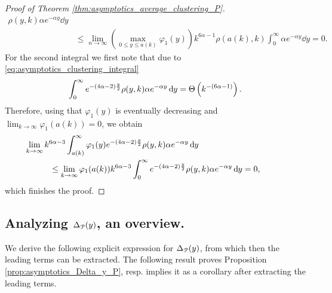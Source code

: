 \begin{proof}[Proof of Theorem \ref{thm:asymptotics_average_clustering_P}]
\begin{align*}
    	\rho(y,k) \alpha e^{-\alpha y} \dd y\\
	&\le \lim_{n \to \infty} \left(\max_{0 \le y \le a(k)} \varphi_1(y)\right) k^{6\alpha - 1} 
    	\rho(a(k), k) \int_0^\infty \alpha e^{-\alpha y} \dd y = 0.
\end{align*}
For the second integral we first note that due to \eqref{eq:asymptotics_clustering_integral}
\[
	\int_0^\infty e^{-(4\alpha - 2)\frac{y}{2}} \rho(y,k) \alpha e^{-\alpha y} \operatorname{\mathrm{d}\hspace{-2pt}} y = \Theta\left(k^{-(6\alpha - 1)}\right).
\] 
Therefore, using that $\varphi_1(y)$ is eventually decreasing and $\lim_{k \to \infty} \varphi_1(a(k)) = 0$, we obtain
\begin{align*}
	&\hspace{-30pt}\lim_{k \to \infty} k^{6\alpha - 3} \int_{a(k)}^{\infty} \varphi_1(y) 
    	e^{-(4\alpha - 2)\frac{y}{2}} \rho(y,k) \alpha e^{-\alpha y} \dd y\\
	&\le \lim_{k \to \infty} \varphi_1(a(k)) k^{6\alpha - 3} \int_0^\infty 
    	e^{-(4\alpha - 2)\frac{y}{2}} \rho(y,k) \alpha e^{-\alpha y} \dd y = 0,
\end{align*}
which finishes the proof. 
\end{proof}

\subsection{Analyzing $\Delta_{{\mathcal P}}(y)$, an overview.}\label{ssec:asymptotics_Delta_y_P}

We derive the following explicit expression for $\Delta_{{\mathcal P}}(y)$, from which then the leading terms can be extracted. The following result proves Proposition \ref{prop:asymptotics_Delta_y_P}, resp. implies it as a corollary after extracting the leading terms. 

